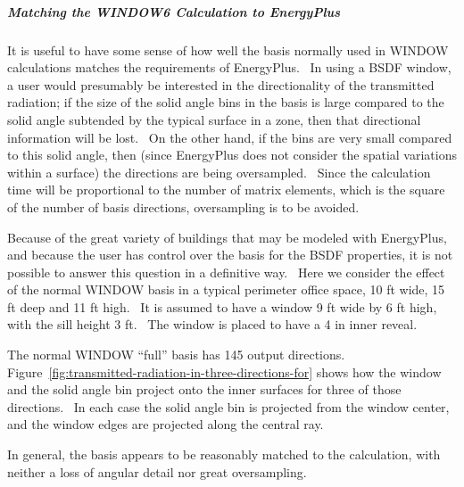\subparagraph{Matching the WINDOW6 Calculation to EnergyPlus}\label{matching-the-window6-calculation-to-energyplus}

It is useful to have some sense of how well the basis normally used in WINDOW calculations matches the requirements of EnergyPlus.~ In using a BSDF window, a user would presumably be interested in the directionality of the transmitted radiation; if the size of the solid angle bins in the basis is large compared to the solid angle subtended by the typical surface in a zone, then that directional information will be lost.~ On the other hand, if the bins are very small compared to this solid angle, then (since EnergyPlus does not consider the spatial variations within a surface) the directions are being oversampled.~ Since the calculation time will be proportional to the number of matrix elements, which is the square of the number of basis directions, oversampling is to be avoided.

Because of the great variety of buildings that may be modeled with EnergyPlus, and because the user has control over the basis for the BSDF properties, it is not possible to answer this question in a definitive way.~ Here we consider the effect of the normal WINDOW basis in a typical perimeter office space, 10 ft wide, 15 ft deep and 11 ft high.~ It is assumed to have a window 9 ft wide by 6 ft high, with the sill height 3 ft.~ The window is placed to have a 4 in inner reveal.

The normal WINDOW ``full'' basis has 145 output directions.~ Figure~\ref{fig:transmitted-radiation-in-three-directions-for} shows how the window and the solid angle bin project onto the inner surfaces for three of those directions.~ In each case the solid angle bin is projected from the window center, and the window edges are projected along the central ray.

In general, the basis appears to be reasonably matched to the calculation, with neither a loss of angular detail nor great oversampling.

